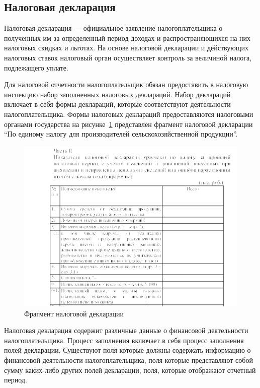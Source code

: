 \documentclass[14pt,a4paper]{reportmod}
\begin{document}
\subsection{Налоговая декларация}
Налоговая декларация — официальное заявление налогоплательщика о полученных им за определенный период доходах и распространяющихся на них налоговых скидках и льготах. На основе налоговой декларации и действующих налоговых ставок налоговый орган осуществляет контроль за величиной налога, подлежащего уплате.\cite{refwikitaxreturn}

Для налоговой отчетности налогоплательщик обязан предоставить в налоговую инспекцию набор заполненных налоговых деклараций. Набор деклараций включает в себя формы деклараций, которые соответствуют деятельности налогоплательщика. Формы налоговых деклараций предоставляются налоговыми органами государства на рисунке~\ref{pic:taxformrb} представлен фрагмент налоговой декларации ``По единому налогу для производителей сельскохозяйственной продукции''.

\begin{figure}
  \centering
  \includegraphics[scale=0.4]{pics/taxformrb}
  \caption{Фрагмент налоговой декларации}
  \label{pic:taxformrb}
\end{figure}


Налоговая декларация содержит различные данные о финансовой деятельности налогоплательщика. Процесс заполнения включает в себя процесс заполнения полей декларации. Существуют поля которые должны содержать информацию о финансовой деятельности налогоплательщика, поля которые представляют собой сумму каких-либо других полей декларации, поля, которые отображают отчетный период.
\end{document}
